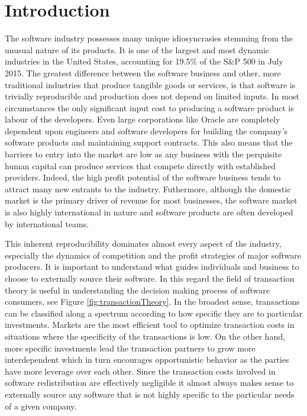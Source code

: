 \section*{Introduction}

The software industry possesses many unique idiosyncrasies stemming from the unusual nature of its products.
It is one of the largest and most dynamic industries in the United States, accounting for 19.5\% of the S\&P 500 in July 2015.\autocite[6]{SurveysSoftware2015}
The greatest difference between the software business and other, more traditional industries that produce tangible goods or services, is that software is trivially reproducible and production does not depend on limited inputs.\autocite[3]{buxmann2012software}
In most circumstances the only significant input cost to producing a software product is labour of the developers.
Even large corporations like Oracle are completely dependent upon engineers and software developers for building the company's software products and maintaining support contracts.\autocite[115]{finkle2012larry}
This also means that the barriers to entry into the market are low as any business with the perquisite human capital can produce services that compete directly with established providers.\autocite[115]{finkle2012larry}
Indeed, the high profit potential of the software business tends to attract many new entrants to the industry.\autocite[116]{finkle2012larry}
Futhermore, although the domestic market is the primary driver of revenue for most businesses,\autocite[]{ITSoftwareEconomist} the software market is also highly international in nature and software products are often developed by international teams.\autocite[3]{buxmann2012software}

This inherent reproducibility dominates almost every aspect of the industry, especially the dynamics of competition and the profit strategies of major software producers.
It is important to understand what guides individuals and business to choose to externally source their software.
In this regard the field of transaction theory is useful in understanding the decision making process of software consumers, see Figure \ref{fig:transactionTheory}.
In the broadest sense, transactions can be classified along a spectrum according to how specific they are to particular investments.
Markets are the most efficient tool to optimize transaction costs in situations where the specificity of the transactions is low.
On the other hand, more specific investments lead the transaction partners to grow more interdependent which in turn encourages opportunistic behavior as the parties have more leverage over each other.\autocite[44]{buxmann2012software}
Since the transaction costs involved in software redistribution are effectively negligible it almost always makes sense to externally source any software that is not highly specific to the particular needs of a given company.

